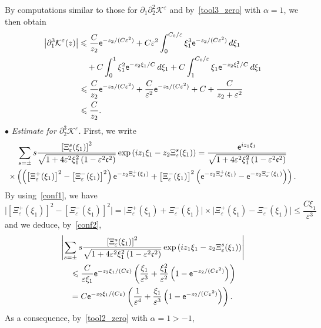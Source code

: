 \documentclass[10pt]{amsart}
\theoremstyle{definition}\newtheorem{defi}[theo]{Definition}\newtheorem{rema}[theo]{Remark}\newtheorem{exam}[theo]{Example}\newtheorem{exem}[theo]{Example}\newtheorem{nota}[theo]{Notation}
\newcommand*\p{\partial}
\newcommand*\BK{\mathcal{K}}
\newcommand*\ex{{\sf e}}
\newcommand*\cs{{\mathfrak c}}
\newcommand*\ls{\leqslant }
\newcommand*\e{\varepsilon}
\renewcommand*\a{\alpha}
\begin{document}
By computations similar to those for $ \p_1\p_2^2 \BK^\e $ and by~\eqref{tool3_zero} with $ \alpha = 1 $, we then obtain
\begin{align*}
\left\lvert \p_1^3 \BK^\e (z) \right\rvert &
\ls \frac{C}{ z_2 } \ex^{ - z_2 / (C\e^2) } + C \e^2 \int_0^{ C_0/ \e} \xi_1^3 \ex^{- z_2 / (C \e^2) } \, d\xi_1
\\ & \quad + C \int_0^{1} \xi_1^2 \ex^{- z_2 \xi_1 / C } \, d\xi_1 + C \int_1^{ C_0 /\e} \xi_1 \ex^{- z_2 \xi_1^2 / C } \, d\xi_1
\\ &
\ls \frac{C }{ z_2} \ex^{- z_2 / (C \e^2) } + \frac{C }{\e^2} \ex^{- z_2 / (C \e^2) } + C + \frac{C}{ z_2 + \e^2 }
\\ &
\ls \frac{C}{ z_2 }.
\end{align*}
$ \bullet $ \emph{Estimate for $ \p_2^3 \BK^\e $.} First, we write
\begin{multline*}
\sum_{ s = \pm} s \frac{ \left[\Xi_\e^s (\xi_1)\right]^2 }{\sqrt{1 + 4 \e^2 \xi_1^2 \left(1 - \e^2 \cs^2\right) } }
\exp\left(iz_1 \xi_1 - z_2 \Xi_\e^s (\xi_1)\right)
 = \frac{ \ex^{ iz_1 \xi_1 } }{\sqrt{1 + 4 \e^2 \xi_1^2 \left(1 - \e^2 \cs^2\right) } }
\\ \times \left(\left(\left[\Xi_\e^+ (\xi_1)\right]^2 - \left[\Xi_\e^- (\xi_1)\right]^2\right) \ex^{ - z_2 \Xi_\e^+ (\xi_1)} + \left[\Xi_\e^- (\xi_1)\right]^2 \left(\ex^{ - z_2 \Xi_\e^+ (\xi_1) } - \ex^{ - z_2 \Xi_\e^- (\xi_1) }\right) \right).
\end{multline*}
By using~\eqref{conf1}, we have
\[
\big\lvert \left[\Xi_\e^+ (\xi_1)\right]^2 - \left[\Xi_\e^- (\xi_1)\right]^2 \big\rvert = \big\lvert \Xi_\e^+ (\xi_1) + \Xi_\e^- (\xi_1) \big\rvert \times \big\lvert \Xi_\e^+ (\xi_1) - \Xi_\e^- (\xi_1) \big\rvert
\ls \frac{C\xi_1}{\e^3}
\]
and we deduce, by~\eqref{conf2},
\begin{multline*}
 \left\lvert \sum_{ s = \pm} s \frac{ \left[\Xi_\e^s (\xi_1)\right]^2 }{\sqrt{1 + 4 \e^2 \xi_1^2 \left(1 - \e^2 \cs^2\right) } }
\exp\left(iz_1 \xi_1 - z_2 \Xi_\e^s (\xi_1)\right) \right\rvert\\
\begin{aligned}
&\ls \frac{C}{\e \xi_1} \ex^{- z_2 \xi_1 / (C \e)}
\left(\frac{\xi_1}{\e^3} + \frac{\xi_1^2}{\e^2} \left(1 - \ex^{ - z_2 / (C\e^2)}\right) \right)
\\ & = C \ex^{- z_2 \xi_1 / (C \e)}
\left(\frac{1}{\e^4} + \frac{\xi_1}{\e^3} \left(1 - \ex^{ - z_2 / (C\e^2) }\right) \right).
\end{aligned}
\end{multline*}
As a consequence, by~\eqref{tool2_zero} with $ \a = 1 > -1 $,
\end{document}
